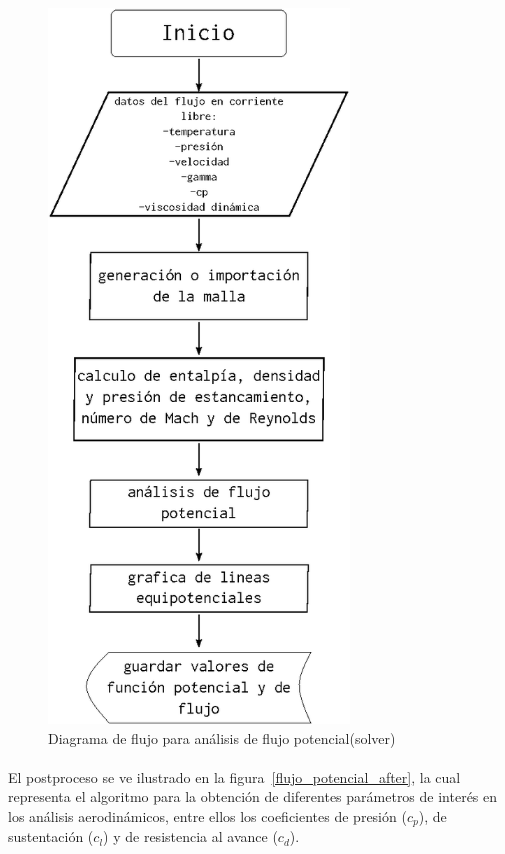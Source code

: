 \documentclass[letterpaper, openright, 12pt]{book}
\begin{document}
    \begin{figure}[htbp!]
        \centering
        \includegraphics[keepaspectratio, width=80mm]{./Imagenes/flujo_potencial}
        \caption{Diagrama de flujo para análisis de flujo potencial(solver)}
        \label{flujo_potencial}
    \end{figure}

    \paragraph*{}
        El postproceso se ve ilustrado en la figura~\ref{flujo_potencial_after},
        la cual representa el algoritmo para la obtención de diferentes
        parámetros de interés en los análisis aerodinámicos, entre ellos los
        coeficientes de presión ($c_p$), de sustentación ($c_l$) y de
        resistencia al avance ($c_d$).
\end{document}
